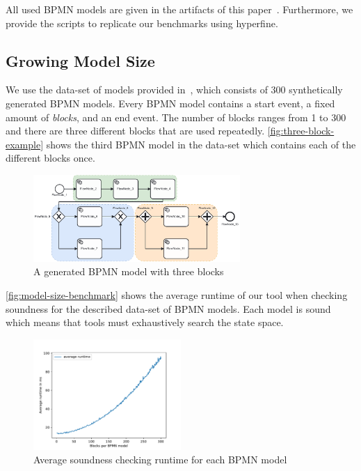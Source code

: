 \documentclass[runningheads]{llncs}
\begin{document}
All used BPMN models are given in the artifacts of this paper~\cite{noauthorgivenBPM2024Artifacts2024}.
Furthermore, we provide the scripts to replicate our benchmarks using hyperfine.


\subsection{Growing Model Size} \label{subsec:model-size}
We use the data-set of models provided in~\cite{krauterHigherorderTransformationApproach2023}, which consists of 300 synthetically generated BPMN models.
Every BPMN model contains a start event, a fixed amount of \textit{blocks}, and an end event.
The number of blocks ranges from 1 to 300 and there are three different blocks that are used repeatedly.
\autoref{fig:three-block-example} shows the third BPMN model in the data-set which contains each of the different blocks once.

\begin{figure}[ht]
	\centering
	\includegraphics[width=0.7\textwidth]{images/three-blocks}
	\caption{A generated BPMN model with three blocks~\cite{krauterHigherorderTransformationApproach2023}}
	\label{fig:three-block-example}
\end{figure}

\autoref{fig:model-size-benchmark} shows the average runtime of our tool when checking soundness for the described data-set of BPMN models.
Each model is sound which means that tools must exhaustively search the state space.

\begin{figure}[ht]
	\centering
	\includegraphics[width=0.5\textwidth]{images/model-size-benchmark}
	\caption{Average soundness checking runtime for each BPMN model}
	\label{fig:model-size-benchmark}
\end{figure}
\end{document}
